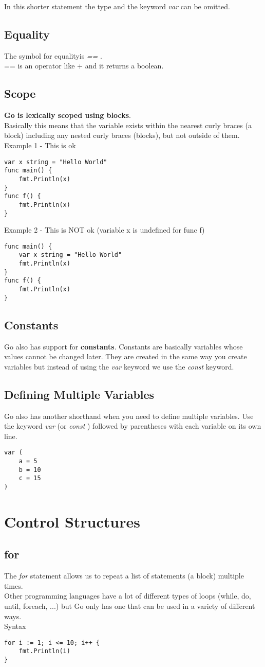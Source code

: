 \documentclass[10pt,letterpaper]{report}
\begin{document}
In this shorter statement the type and the keyword \textit{var} can be omitted.
\section{Equality}
The symbol for equalityis \textit{==} .\\
== is an operator like + and it returns a boolean.
\section{Scope}
\textbf{Go is lexically scoped using blocks}.\\
Basically this means that the variable exists within the nearest curly braces { } (a block) including any nested curly braces (blocks), but not outside of them.\\
Example 1 - This is ok
\begin{lstlisting}
var x string = "Hello World"
func main() {
	fmt.Println(x)
}
func f() {
	fmt.Println(x)
}
\end{lstlisting}
Example 2 - This is NOT ok (variable x is undefined for func f)
\begin{lstlisting}
func main() {
	var x string = "Hello World"
	fmt.Println(x)
}
func f() {
	fmt.Println(x)
}
\end{lstlisting}
\section{Constants}
Go also has support for \textbf{constants}. Constants are basically variables whose values cannot be changed later. They are created in the same way you create variables but instead of using the \textit{var} keyword we use the \textit{const} keyword.
\section{Defining Multiple Variables}
Go also has another shorthand when you need to define multiple variables. Use the keyword \textit{var} (or \textit{const} ) followed by parentheses with each variable on its own line.
\begin{lstlisting}
var (
	a = 5
	b = 10
	c = 15
)
\end{lstlisting}
\chapter{Control Structures}
\section{for}
The \textit{for} statement allows us to repeat a list of statements (a block) multiple times.\\
Other programming languages have a lot of different types of loops (while, do, until, foreach, ...) but Go only has one that can be used in a variety of different ways.\\
Syntax
\begin{lstlisting}
for i := 1; i <= 10; i++ {
	fmt.Println(i)
}
\end{lstlisting}
\end{document}
